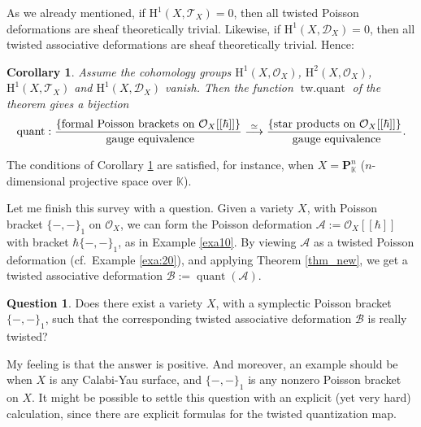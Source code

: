\documentclass{conm-p-l}
\newtheorem{cor}[equation]{Corollary}
\theoremstyle{definition}
\newtheorem{que}[equation]{Question}
\numberwithin{equation}{section}
\newcommand{\iso}{\stackrel{\simeq}{\longrightarrow}}
\newcommand{\opn}{\operatorname}
\newcommand{\mcal}[1]{\mathcal{#1}}
\newcommand{\mbf}[1]{\mathbf{#1}}
\newcommand{\mrm}[1]{\mathrm{#1}}
\newcommand{\mbb}[1]{\mathbb{#1}}
\newcommand{\tup}[1]{\textup{#1}}
\newcommand{\bsym}[1]{\boldsymbol{#1}}
\newcommand{\K}{\mbb{K}}
\begin{document}
As we already mentioned, if $\mrm{H}^1(X, \mcal{T}_{X}) = 0$, then all
twisted Poisson deformations are sheaf theoretically trivial. 
Likewise, if $\mrm{H}^1(X, \mcal{D}_{X}) = 0$, then all
twisted associative deformations are sheaf theoretically trivial. 
Hence:

\begin{cor}  \label{cor_new3}
Assume the cohomology groups $\mrm{H}^1(X, \mcal{O}_{X})$,
$\mrm{H}^2(X, \mcal{O}_{X})$, \linebreak
$\mrm{H}^1(X, \mcal{T}_{X})$ and
$\mrm{H}^1(X, \mcal{D}_{X})$
vanish. Then the function $\opn{tw{.}quant}$ of the theorem gives a bijection
\[ \opn{quant} : \frac{ \{ \tup{formal Poisson brackets on 
$\mcal{O}_{X}[[\hbar]]$} \} }{\tup{ gauge equivalence}} 
\iso
\frac{ \{ \tup{star products on $\mcal{O}_X[[\hbar]]$} \} }
{\tup{ gauge equivalence}} .
 \] 
% 
\end{cor} 

The conditions of Corollary \ref{cor_new3} are satisfied, for instance, when
$X = \mbf{P}^n_{\K}$ ($n$-dimensional projective space over $\K$). 

Let me finish this survey with a question. 
Given a variety $X$, with Poisson bracket $\{-,-\}_1$ on 
$\mcal{O}_X$, we can form the Poisson deformation 
$\mcal{A} := \mcal{O}_X[[\hbar]]$ with bracket $\hbar \{-,-\}_1$,
as in Example \ref{exa10}. 
By viewing $\mcal{A}$ as a twisted Poisson deformation
(cf.\ Example \ref{exa:20}), and applying
Theorem \ref{thm_new}, we get a twisted associative deformation 
$\bsym{\mcal{B}} := \opn{quant}(\mcal{A})$.

\begin{que}
Does there exist a variety $X$, with a symplectic
Poisson bracket $\{-,-\}_1$, such that the corresponding twisted
associative deformation $\bsym{\mcal{B}}$ is really twisted?
\end{que}

My feeling is that the answer is positive. 
And moreover, an example should be when $X$ is any Calabi-Yau surface,
and $\{-,-\}_1$ is any nonzero Poisson bracket on $X$.
It might be possible to settle this question with an explicit (yet very hard)
calculation, since there are explicit formulas for the twisted quantization
map. 
\end{document}
